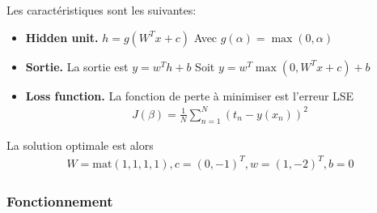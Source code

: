 \documentclass[a4paper]{article}
\begin{document}
Les caractéristiques sont les suivantes:
\begin{itemize}
    \item \textbf{Hidden unit.} $h= g(W^T x + c)$ Avec $g(\alpha) = \max (0,\alpha)$
    \item \textbf{Sortie.} La sortie est $y=w^T h + b$ Soit $y= w^T\max (0, W^T x + c) + b$
    \item \textbf{Loss function.} La fonction de perte à minimiser est l'erreur LSE
    \begin{align*}
        J(\beta) = \frac{1}{N} \sum_{n=1}^{N} (t_n - y(x_n))^2
    \end{align*}
\end{itemize}
La solution optimale est alors 
\begin{align*}
    W= \text{mat}(1,1,1,1), c=(0, -1)^T, w=(1,-2)^T, b=0
\end{align*}
\subsubsection{Fonctionnement}
\end{document}
